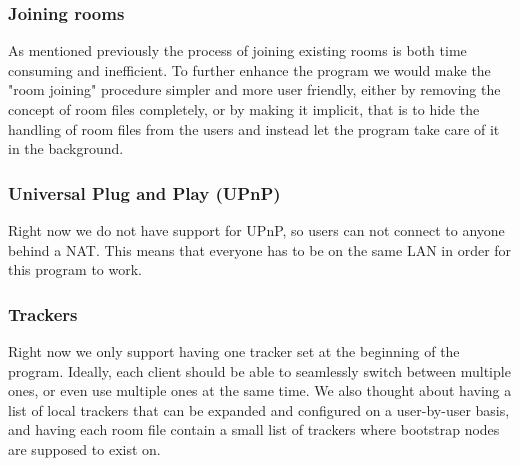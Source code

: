 \documentclass[12pt, a4paper]{article}
\begin{document}
\subsubsection{Joining rooms}

As mentioned previously the process of joining existing rooms is both time consuming and inefficient. To further enhance the program we would make the "room joining" procedure simpler and more user friendly, either by removing the concept of room files completely, or by making it implicit, that is to hide the handling of room files from the users and instead let the program take care of it in the background.


\subsubsection{Universal Plug and Play (UPnP)}

Right now we do not have support for UPnP, so users can not connect to anyone behind a NAT. This means that everyone has to be on the same LAN in order for this program to work. %

\subsubsection{Trackers}

Right now we only support having one tracker set at the beginning of the program. Ideally, each client should be able to seamlessly switch between multiple ones, or even use multiple ones at the same time. We also thought about having a list of local trackers that can be expanded and configured on a user-by-user basis, and having each room file contain a small list of trackers where bootstrap nodes are supposed to exist on.


\end{document}
